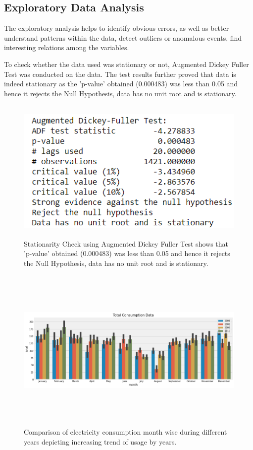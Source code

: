 \documentclass[12 pt]{report}
\begin{document}
\newpage 
\subsection{Exploratory Data Analysis}

The exploratory analysis helps to identify obvious errors, as well as better understand patterns within the data, detect outliers or anomalous events, find interesting relations among the variables.  
\newline
  
  To check whether the data used was stationary or not, Augmented Dickey Fuller Test was conducted on the data. The test results further proved that data is indeed stationary as the 'p-value' obtained (0.000483) was less than 0.05 and hence it rejects the Null Hypothesis, data has no unit root and is stationary.
    \begin{figure}[h!]
  \centering
  \includegraphics[width=12cm,height = 7cm,frame]{images/ADF.png}
  \caption{Stationarity Check using Augmented Dickey Fuller Test shows that 'p-value' obtained (0.000483) was less than 0.05 and hence it rejects the Null Hypothesis, data has no unit root and is stationary.}
  \label{fig:Stationarity Check using Augmented Dickey Fuller Test}
  \end{figure}
  
    
    \begin{figure}[h!]
  \centering
  \includegraphics[width=14cm,height = 8cm,frame]{images/eda2.png}
  \caption{Comparison of electricity consumption month wise during different years depicting increasing trend of usage by years.}
  \label{fig:Monthwise aggregate usage}
  \end{figure}
  
\end{document}
